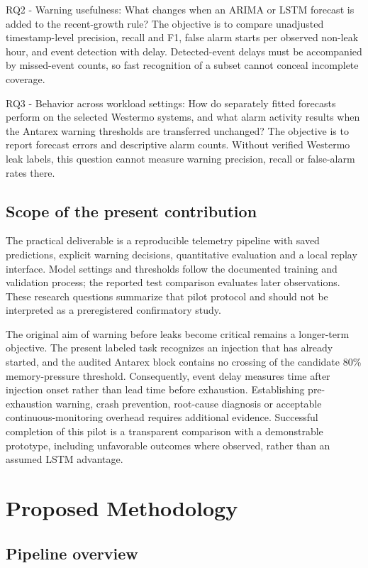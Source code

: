 \documentclass[10pt,a4paper,twocolumn]{article}
\begin{document}
RQ2 - Warning usefulness: What changes when an ARIMA or LSTM forecast is added to the recent-growth rule? The objective is to compare unadjusted timestamp-level precision, recall and F1, false alarm starts per observed non-leak hour, and event detection with delay. Detected-event delays must be accompanied by missed-event counts, so fast recognition of a subset cannot conceal incomplete coverage.

RQ3 - Behavior across workload settings: How do separately fitted forecasts perform on the selected Westermo systems, and what alarm activity results when the Antarex warning thresholds are transferred unchanged? The objective is to report forecast errors and descriptive alarm counts. Without verified Westermo leak labels, this question cannot measure warning precision, recall or false-alarm rates there.

\subsection{Scope of the present contribution}

The practical deliverable is a reproducible telemetry pipeline with saved predictions, explicit warning decisions, quantitative evaluation and a local replay interface. Model settings and thresholds follow the documented training and validation process; the reported test comparison evaluates later observations. These research questions summarize that pilot protocol and should not be interpreted as a preregistered confirmatory study.

The original aim of warning before leaks become critical remains a longer-term objective. The present labeled task recognizes an injection that has already started, and the audited Antarex block contains no crossing of the candidate 80\% memory-pressure threshold. Consequently, event delay measures time after injection onset rather than lead time before exhaustion. Establishing pre-exhaustion warning, crash prevention, root-cause diagnosis or acceptable continuous-monitoring overhead requires additional evidence. Successful completion of this pilot is a transparent comparison with a demonstrable prototype, including unfavorable outcomes where observed, rather than an assumed LSTM advantage.

\section{Proposed Methodology}

\subsection{Pipeline overview}
\end{document}
